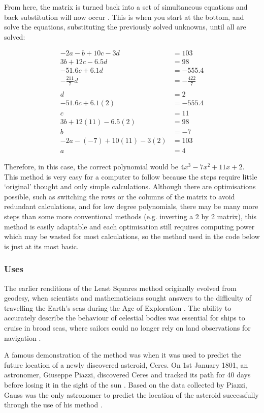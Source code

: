 \documentclass{article}
\begin{document}
From here, the matrix is turned back into a set of simultaneous equations and back substitution will now occur \cite{eliminationmethod}. This is when you start at the bottom, and solve the equations, substituting the previously solved unknowns, until all are solved:

\begin{align*}
    -2a - b + 10c - 3d &= 103 \\
    3b + 12c - 6.5d &= 98 \\
    -51.6c + 6.1d &= -555.4 \\
    -\frac{211}{7}d &= -\frac{422}{7} \\ \\
    d &= 2 \\
    -51.6c + 6.1(2) &= -555.4 \\
    c &= 11 \\
    3b + 12(11) - 6.5(2) &= 98 \\
    b &= -7 \\
    -2a - (-7) + 10(11) - 3(2) &= 103 \\
    a &= 4
\end{align*}

Therefore, in this case, the correct polynomial would be \(4x^3 - 7x^2 + 11x + 2\). This method is very easy for a computer to follow because the steps require little `original' thought and only simple calculations. Although there are optimisations possible, such as switching the rows or the columns of the matrix to avoid redundant calculations, and for low degree polynomials, there may be many more steps than some more conventional methods (e.g. inverting a 2 by 2 matrix), this method is easily adaptable and each optimisation still requires computing power which may be wasted for most calculations, so the method used in the code below is just at its most basic.

\subsubsection{Uses}
The earlier renditions of the Least Squares method originally evolved from geodesy, when scientists and mathematicians sought answers to the difficulty of travelling the Earth's seas during the Age of Exploration \cite{sea}. The ability to accurately describe the behaviour of celestial bodies was essential for ships to cruise in broad seas, where sailors could no longer rely on land observations for navigation \cite{sea}.

A famous demonstration of the method was when it was used to predict the future location of a newly discovered asteroid, Ceres. On 1st January 1801, an astronomer, Giuseppe Piazzi, discovered Ceres and tracked its path for 40 days before losing it in the sight of the sun \cite{sea}. Based on the data collected by Piazzi, Gauss was the only astronomer to predict the location of the asteroid successfully through the use of his method \cite{sea}. 
\end{document}
